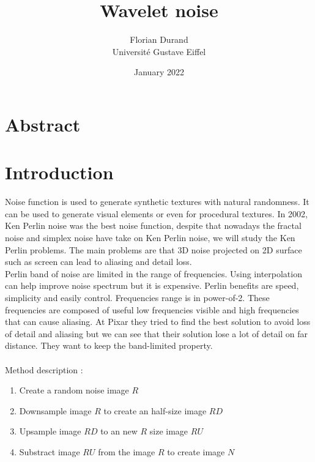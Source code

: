 \documentclass[11pt,a4paper]{article}
\title{Wavelet noise}
\date{January 2022}
\author{Florian Durand \\ Université Gustave Eiffel}
\begin{document}
\maketitle


\section{Abstract}



\section{Introduction}

Noise function is used to generate synthetic textures with natural randomness. It can be used to generate visual elements or even for procedural textures. In 2002, Ken Perlin noise was the best noise function, despite that nowadays the fractal noise and simplex noise have take on Ken Perlin noise, we will study the Ken Perlin problems. The main problems are that 3D noise projected on 2D surface such as screen can lead to aliasing and detail loss.
\\
Perlin band of noise are limited in the range of frequencies. Using interpolation can help improve noise spectrum but it is expensive.
Perlin benefits are speed, simplicity and easily control. Frequencies range is in power-of-2. These frequencies are composed of useful low frequencies visible and high frequencies that can cause aliasing.
At Pixar they tried to find the best solution to avoid loss of detail and aliasing but we can see that their solution lose a lot of detail on far distance. They want to keep the band-limited property.
\\\\
Method description :
\begin{enumerate}
\item Create a random noise image $R$
\item Downsample image $R$ to create an half-size image $RD$
\item Upsample image $RD$ to an new $R$ size image $RU$
\item Substract image $RU$ from the image $R$ to create image $N$
\end{enumerate}
\end{document}
